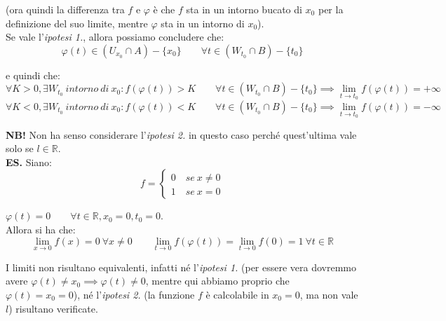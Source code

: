 \documentclass{article}
\begin{document}
\noindent (ora quindi la differenza tra $f$ e $\varphi$ è che $f$ sta in un intorno bucato di $x_0$ per la definizione del suo limite, mentre $\varphi$ sta in un intorno di $x_0$).\\
Se vale l'\textit{ipotesi 1.}, allora possiamo concludere che:
\begin{equation*}
    \varphi(t) \in (U_{x_0} \cap A) - \{x_0\} \qquad \forall t \in (W_{t_0} \cap B) - \{t_0\}
\end{equation*}

\noindent e quindi che:
\begin{equation*}
    \forall K > 0, \exists W_{t_0} \ intorno \ di \ x_0 : f(\varphi(t)) > K \qquad \forall t \in (W_{t_0} \cap B) - \{t_0\} \implies \lim_{t \to t_0} f(\varphi(t)) = +\infty
\end{equation*}
\begin{equation*}
    \forall K < 0, \exists W_{t_0} \ intorno \ di \ x_0 : f(\varphi(t)) < K \qquad \forall t \in (W_{t_0} \cap B) - \{t_0\} \implies \lim_{t \to t_0} f(\varphi(t)) = -\infty
\end{equation*}

\noindent\textbf{NB!} Non ha senso considerare l'\textit{ipotesi 2.} in questo caso perché quest'ultima vale solo se $l \in \mathbb{R}$.\\

\noindent\textbf{ES.} Siano:
\begin{equation*}
    f =
    \begin{cases}
       0 \quad se \ x \neq 0\\
       1 \quad se \ x = 0
    \end{cases}
\end{equation*}

\noindent $\varphi(t) = 0 \qquad \forall t \in \mathbb{R}, x_0 = 0, t_0 = 0$.\\
Allora si ha che:
\begin{equation*}
    \lim_{x \to 0} f(x) = 0 \ \forall x \neq 0 \qquad \lim_{t \to 0} f(\varphi(t)) = \lim_{t \to 0} f(0) = 1 \ \forall t \in \mathbb{R}
\end{equation*}

\noindent I limiti non risultano equivalenti, infatti né l'\textit{ipotesi 1.} (per essere vera dovremmo avere $\varphi(t) \neq x_0 \implies \varphi(t) \neq 0$, mentre qui abbiamo proprio che $\varphi(t) = x_0 = 0$), né l'\textit{ipotesi 2.} (la funzione $f$ è calcolabile in $x_0 = 0$, ma non vale $l$) risultano verificate.\\
\end{document}
